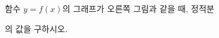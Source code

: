 \noindent\begin{minipage}[t]{0.58\linewidth}\vspace{0pt}\raggedright 함수 $y=f(x)$의 그래프가 오른쪽 그림과 같을 때, 정적분 \par\smallskip\end{minipage}\hfill\begin{minipage}[t]{0.4\linewidth}\vspace{0pt}\centering \resizebox{\ifdim\width>\linewidth\linewidth\else\width\fi}{!}{}\end{minipage}\par
\noindent {}\par\smallskip\noindent 의 값을 구하시오.
